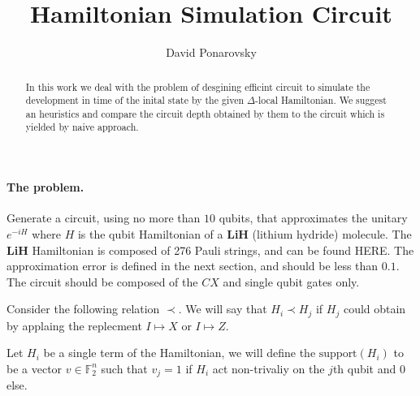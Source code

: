 \documentclass{article}
\newcommand{\commentt}[1]{\textcolor{blue}{ \textbf{[COMMENT]} #1}}
\newcommand{\ctt}[1]{\commentt{#1}}
\newcommand{\PSI}{{\ket{\psi}}}
\begin{document}
\title{Hamiltonian Simulation Circuit}
\author{David Ponarovsky}
\maketitle
\begin{abstract} 
  In this work we deal with the problem of desgining efficint circuit to simulate the development in time of the inital state by the given $\Delta$-local Hamiltonian. We suggest an heuristics and  compare the circuit depth obtained by them to the circuit which is yielded by naive approach.   
\end{abstract}


\paragraph{The problem.} Generate a circuit, using no more than \(10\) qubits, that approximates the unitary \(e^{-iH}\) where \(H\) is the qubit Hamiltonian of a \textbf{LiH} (lithium hydride) molecule. The \textbf{LiH} Hamiltonian is composed of 276 Pauli strings, and can be found HERE. The approximation error is defined in the next section, and should be less than \(0.1\). The circuit should be composed of the \(CX\) and single qubit gates only.

\begin{definition}
  Consider the following relation $\prec$. We will say that $H_{i} \prec H_{j}$ if $H_{j}$ could obtain by applaing the replecment $I \mapsto X  $ or $ I \mapsto Z$. 

\end{definition}
\begin{definition}
  Let \(H_{i}\) be a single term of the Hamiltonian, we will define the \( \text{support}(H_{i}) \) to be a vector \( v \in \mathbb{F}^{n}_2\) such that \(v_j = 1\) if \(H_{i}\) act non-trivaliy on the \(j\)th qubit and \(0\) else.
\end{definition}
\end{document}
